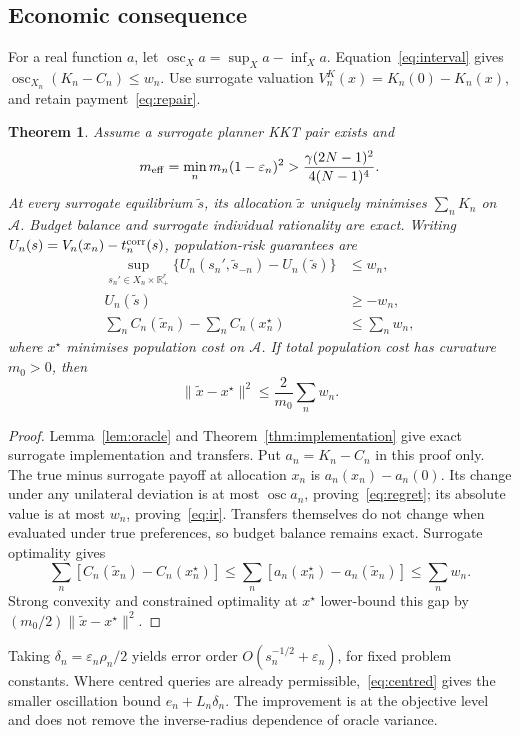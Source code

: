 \documentclass{article}
\newtheorem{theorem}{Theorem}
\DeclareMathOperator{\osc}{osc}
\begin{document}
\subsection{Economic consequence}
For a real function \(a\), let \(\osc_X a=\sup_Xa-\inf_Xa\).
Equation~\eqref{eq:interval} gives \(\osc_{X_n}(K_n-C_n)\le w_n\).
Use surrogate valuation \(V_n^K(x)=K_n(0)-K_n(x)\), and retain
payment~\eqref{eq:repair}.
\begin{theorem}\label{thm:economic}
Assume a surrogate planner KKT pair exists and
\[
 m_{\rm eff}=\min_n m_n(1-\varepsilon_n)^2
 >\frac{\gamma(2N-1)^2}{4(N-1)^4}.
\]
At every surrogate equilibrium \(\widetilde s\), its allocation
\(\widetilde x\) uniquely minimises \(\sum_nK_n\) on \(\mathcal A\).
Budget balance and surrogate individual rationality are exact. Writing
\(U_n(s)=V_n(x_n)-t_n^{\rm corr}(s)\), population-risk guarantees are
\begin{align}
 \sup_{s_n'\in X_n\times\mathbb R_+^r}
 \{U_n(s_n',\widetilde s_{-n})-U_n(\widetilde s)\}&\le w_n,\label{eq:regret}\\
 U_n(\widetilde s)&\ge-w_n,\label{eq:ir}\\
 \sum_n C_n(\widetilde x_n)-\sum_n C_n(x_n^\star)&\le\sum_nw_n,
 \label{eq:welfare}
\end{align}
where \(x^\star\) minimises population cost on \(\mathcal A\).
If total population cost has curvature \(m_0>0\), then
\begin{equation}\label{eq:allocation}
 \|\widetilde x-x^\star\|^2\le\frac{2}{m_0}\sum_nw_n.
\end{equation}
\end{theorem}
\begin{proof}
Lemma~\ref{lem:oracle} and Theorem~\ref{thm:implementation} give exact
surrogate implementation and transfers. Put \(a_n=K_n-C_n\) in this
proof only. The true minus surrogate payoff at allocation \(x_n\) is
\(a_n(x_n)-a_n(0)\). Its change under any unilateral deviation is at
most \(\osc a_n\), proving~\eqref{eq:regret}; its absolute value is at
most \(w_n\), proving~\eqref{eq:ir}. Transfers themselves do not change
when evaluated under true preferences, so budget balance remains exact.
Surrogate optimality gives
\[
 \sum_n[C_n(\widetilde x_n)-C_n(x_n^\star)]
 \le\sum_n[a_n(x_n^\star)-a_n(\widetilde x_n)]\le\sum_nw_n.
\]
Strong convexity and constrained optimality at \(x^\star\) lower-bound
this gap by \((m_0/2)\|\widetilde x-x^\star\|^2\).
\end{proof}
Taking \(\delta_n=\varepsilon_n\rho_n/2\) yields error order
\(O(s_n^{-1/2}+\varepsilon_n)\), for fixed problem constants.
Where centred queries are already permissible,~\eqref{eq:centred} gives
the smaller oscillation bound \(e_n+L_n\delta_n\).
The improvement is at the objective level and does not remove the
inverse-radius dependence of oracle variance.
\end{document}
